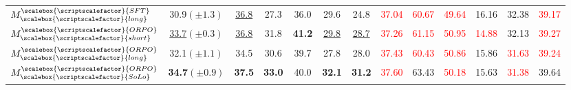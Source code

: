 \begin{table}[th]
\begin{tabular}{lcccccccccccc}
$M^{\scalebox{\scriptscalefactor}{SFT}}_{\scalebox{\scriptscalefactor}{long}}$& 30.9$(\pm1.3)$&\underline{36.8}&27.3&36.0&29.6&24.8& \textcolor{red}{37.04} & \textcolor{red}{60.67} & \textcolor{red}{49.64} & 16.16 & 32.38 & \textcolor{red}{39.17} \\
$M^{\scalebox{\scriptscalefactor}{ORPO}}_{\scalebox{\scriptscalefactor}{short}}$&\underline{33.7}$(\pm0.3)$&\underline{36.8}&31.8&\textbf{41.2}&\underline{29.8}&\underline{28.7}& \textcolor{red}{37.26} & \textcolor{red}{61.15} & \textcolor{red}{50.95} & \textcolor{red}{14.88} & 32.13 & \textcolor{red}{39.27} \\
$M^{\scalebox{\scriptscalefactor}{ORPO}}_{\scalebox{\scriptscalefactor}{long}}$ &32.1$(\pm1.1)$&34.5&30.6&39.7&27.8&28.0 & \textcolor{red}{37.43} & \textcolor{red}{60.43} & \textcolor{red}{50.86 } & 15.86 & \textcolor{red}{31.63} & \textcolor{red}{39.24}\\
\rowcolor{Gray}$M^{\scalebox{\scriptscalefactor}{ORPO}}_{\scalebox{\scriptscalefactor}{SoLo}}$&\textbf{34.7}$(\pm0.9)$&\textbf{37.5}&\textbf{33.0}&40.0&\textbf{32.1}&\textbf{31.2}& \textcolor{red}{37.60 }& 63.43 & \textcolor{red}{50.18 }& 15.63 & \textcolor{red}{31.38} & 39.64 \\
\bottomrule
\end{tabular}
\label{tab:lbV2_short_ben_results}
\vspace{-10pt}
\end{table}
